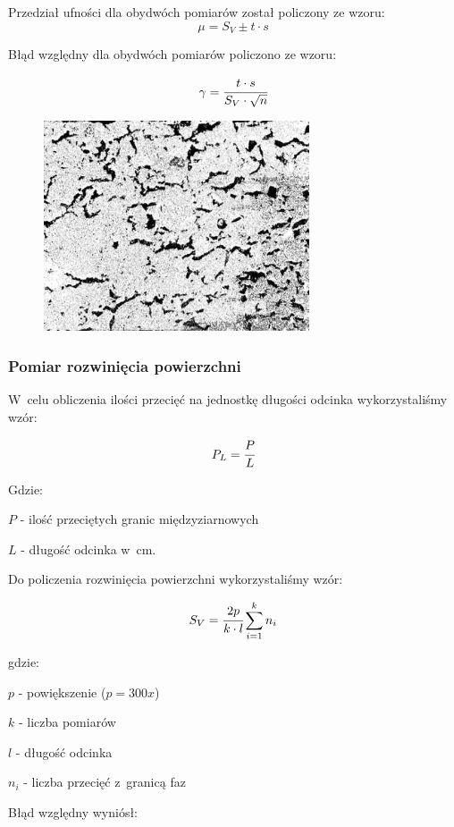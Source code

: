 \documentclass[a4paper,12pt]{article}
\begin{document}
Przedział ufności dla obydwóch pomiarów został policzony ze wzoru:
$$\mu = S_V\pm t\cdot s$$
\newline 

Błąd względny dla obydwóch pomiarów policzono ze wzoru:

$$\gamma=\cfrac{t\cdot s}{S_V\cdot \sqrt{n}}$$

\begin{figure}[H]
    \centering
    \includegraphics[width=0.7\textwidth]{img/SV.png}
\end{figure}


\subsubsection{Pomiar rozwinięcia powierzchni}

W~celu obliczenia ilości przecięć na jednostkę długości odcinka wykorzystaliśmy wzór:

$$P_L=\cfrac{P}{L}$$

Gdzie:

$P$ - ilość przeciętych granic międzyziarnowych

$L$ - długość odcinka w~cm.

Do policzenia rozwinięcia powierzchni wykorzystaliśmy wzór:

$$S_V=\cfrac{2p}{k\cdot l} \sum ^k_{i=1}n_i$$

gdzie:

{\color{purple}$p$ - powiększenie ($p=300x$)}

$k$ - liczba pomiarów

$l$ - długość odcinka

$n_i$ - liczba przecięć z~granicą faz


\newpage

Błąd względny wyniósł:
\end{document}
